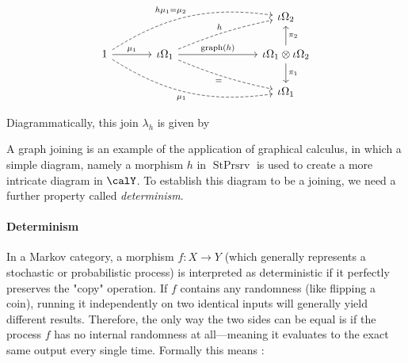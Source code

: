 \documentclass[12pt,oneside,pb-diagram]{article}
\DeclareMathOperator{\sps}{StPrsrv}
\DeclareMathOperator{\graph}{graph}
\begin{document}
\begin{definition}  \label{def:graph_join}
	\cite[Eqn 1]{LemanczykEtAl1993gaussian}
	\begin{equation} \label{eqn:def:graph_join:1}
		\begin{tikzcd} [column sep = large]
			& && \iota \Omega_2\\
			1 \arrow[urrr, bend left=20, "h\mu_1 = \mu_2", dashed] \arrow[drrr, bend right=20, "\mu_1"', dashed] \arrow[r, "\mu_1"] & \iota \Omega_1  \arrow[bend left=5, urr, "h", dashed] \arrow[drr, bend right=5, "="', dashed] \arrow[rr, "\graph(h)"] && \iota \Omega_1 \otimes \iota \Omega_2 \arrow[d, "\pi_1"] \arrow[u, "\pi_2"'] \\
			& && \iota \Omega_1
		\end{tikzcd}
	\end{equation}
\end{definition}

Diagrammatically, this join $\lambda_h$ is given by
\begin{center}
\end{center} 

A graph joining is an example of the application of graphical calculus, in which a simple diagram, namely a morphism $h$ in $\sps$ is used to create a more intricate diagram in $\calY$. To establish this diagram to be a joining, we need a further property called \emph{determinism}.

\paragraph{Determinism} In a Markov category, a morphism $f: X \to Y$ (which generally represents a stochastic or probabilistic process) is interpreted as deterministic if it perfectly preserves the "copy" operation. If $f$ contains any randomness (like flipping a coin), running it independently on two identical inputs will generally yield different results. Therefore, the only way the two sides can be equal is if the process $f$ has no internal randomness at all—meaning it evaluates to the exact same output every single time. Formally this means :
\end{document}
